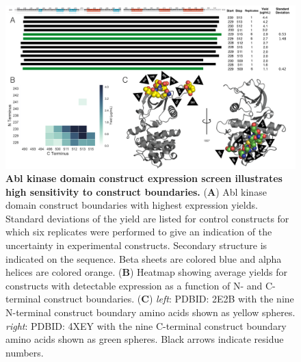 \documentclass[9pt,lineno]{elife}
\begin{document}
\begin{figure}[b!]
\centering
\begin{fullwidth}
   \includegraphics[width=\linewidth]{abl1-construct-wholefigure.pdf}
  \caption{{\bf Abl kinase domain construct expression screen illustrates high sensitivity to construct boundaries.}
  ({\bf A}) Abl kinase domain construct boundaries with highest expression yields. 
  Standard deviations of the yield are listed for control constructs for which six replicates were performed to give an indication of the uncertainty in experimental constructs. Secondary structure is indicated on the sequence. Beta sheets are colored blue and alpha helices are colored orange. 
	({\bf B}) Heatmap showing average yields for constructs with detectable expression as a function of N- and C-terminal construct boundaries.
  ({\bf C}) \emph{left}: PDBID: 2E2B with the nine N-terminal construct boundary amino acids shown as yellow spheres. 
  \emph{right}: PDBID: 4XEY with the nine C-terminal construct boundary amino acids shown as green spheres. 
  Black arrows indicate residue numbers. 
   }
  \label{fig:ab1-const-fig}
\end{fullwidth}
\end{figure}
\end{document}
